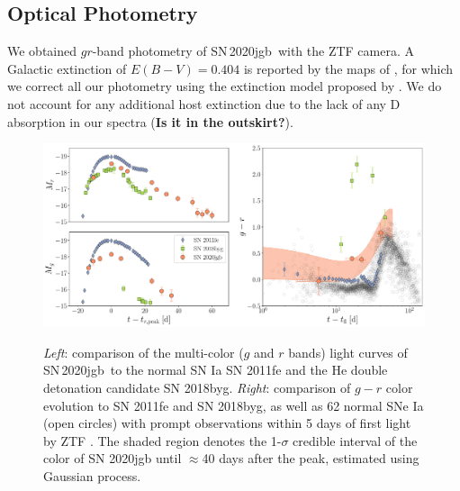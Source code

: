\documentclass[twocolumn]{aastex631}
\newcommand\sn{SN\,2020jgb}
\begin{document}
\subsection{Optical Photometry}
We obtained $gr$-band photometry of \sn\ with the ZTF camera. A Galactic extinction of $E(B-V)=0.404$ is reported by the maps of \citet{Schlafly2011}, for which we correct all our photometry using the extinction model proposed by \citet{Fitzpatrick1999}. We do not account for any additional host extinction due to the lack of any  D absorption in our spectra (\textbf{Is it in the outskirt?}).
\begin{figure}
    \centering
    \includegraphics[width=\textwidth]{photometry.pdf}
    \label{fig:photometry}
    \caption{\textit{Left}: comparison of the multi-color ($g$ and $r$ bands) light curves of \sn\ to the normal SN Ia SN 2011fe and the He double detonation candidate SN 2018byg. \textit{Right}: comparison of $g-r$ color evolution to SN 2011fe and SN 2018byg, as well as 62 normal SNe Ia (open circles) with prompt observations within 5 days of first light by ZTF \citep{Bulla2020}. The shaded region denotes the 1-$\sigma$ credible interval of the color of SN 2020jgb until $\approx$40 days after the peak, estimated using Gaussian process.}
\end{figure}
\end{document}

